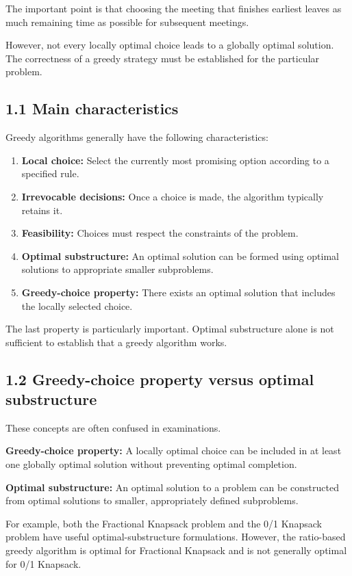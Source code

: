 The important point is that choosing the meeting that finishes earliest leaves as much remaining time as possible for subsequent meetings.

However, not every locally optimal choice leads to a globally optimal solution. The correctness of a greedy strategy must be established for the particular problem.

\subsection{1.1 Main characteristics}

Greedy algorithms generally have the following characteristics:

\begin{enumerate}
    \item \textbf{Local choice:} Select the currently most promising option according to a specified rule.
    \item \textbf{Irrevocable decisions:} Once a choice is made, the algorithm typically retains it.
    \item \textbf{Feasibility:} Choices must respect the constraints of the problem.
    \item \textbf{Optimal substructure:} An optimal solution can be formed using optimal solutions to appropriate smaller subproblems.
    \item \textbf{Greedy-choice property:} There exists an optimal solution that includes the locally selected choice.
\end{enumerate}

The last property is particularly important. Optimal substructure alone is not sufficient to establish that a greedy algorithm works.

\subsection{1.2 Greedy-choice property versus optimal substructure}

These concepts are often confused in examinations.

\textbf{Greedy-choice property:} A locally optimal choice can be included in at least one globally optimal solution without preventing optimal completion.

\textbf{Optimal substructure:} An optimal solution to a problem can be constructed from optimal solutions to smaller, appropriately defined subproblems.

For example, both the Fractional Knapsack problem and the 0/1 Knapsack problem have useful optimal-substructure formulations. However, the ratio-based greedy algorithm is optimal for Fractional Knapsack and is not generally optimal for 0/1 Knapsack.

